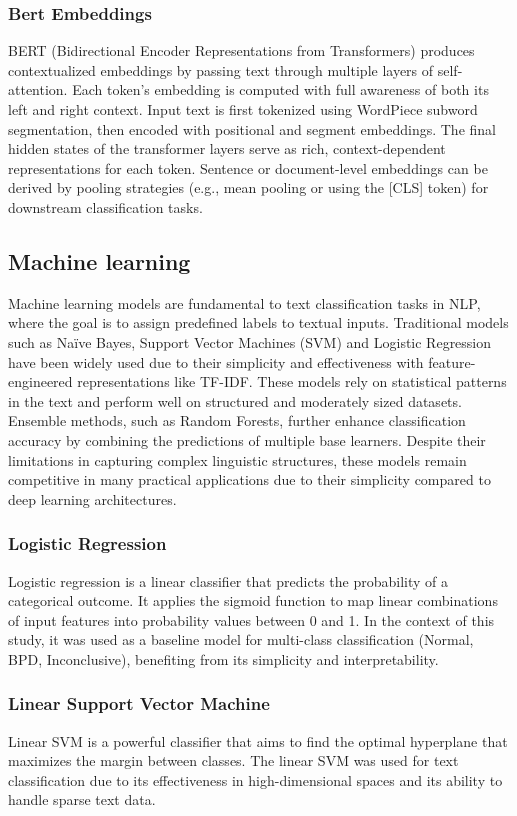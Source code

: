 \subsubsection{Bert Embeddings}
BERT (Bidirectional Encoder Representations from Transformers) produces contextualized embeddings by passing text through multiple layers of self-attention. Each token’s embedding is computed with full awareness of both its left and right context. Input text is first tokenized using WordPiece subword segmentation, then encoded with positional and segment embeddings. The final hidden states of the transformer layers serve as rich, context-dependent representations for each token. Sentence or document-level embeddings can be derived by pooling strategies (e.g., mean pooling or using the [CLS] token) for downstream classification tasks.

\subsection{Machine learning} Machine learning models are fundamental to text classification tasks in NLP, where the goal is to assign predefined labels to textual inputs. Traditional models such as Naïve Bayes, Support Vector Machines (SVM) and Logistic Regression have been widely used due to their simplicity and effectiveness with feature-engineered representations like TF-IDF. These models rely on statistical patterns in the text and perform well on structured and moderately sized datasets. Ensemble methods, such as Random Forests, further enhance classification accuracy by combining the predictions of multiple base learners. Despite their limitations in capturing complex linguistic structures, these models remain competitive in many practical applications due to their simplicity compared to deep learning architectures.

\subsubsection{Logistic Regression} Logistic regression is a linear classifier that predicts the probability of a categorical outcome. It applies the sigmoid function to map linear combinations of input features into probability values between 0 and 1. In the context of this study, it was used as a baseline model for multi-class classification (Normal, BPD, Inconclusive), benefiting from its simplicity and interpretability.

\subsubsection{Linear Support Vector Machine} Linear SVM is a powerful classifier that aims to find the optimal hyperplane that maximizes the margin between classes. The linear SVM was used for text classification due to its effectiveness in high-dimensional spaces and its ability to handle sparse text data.

